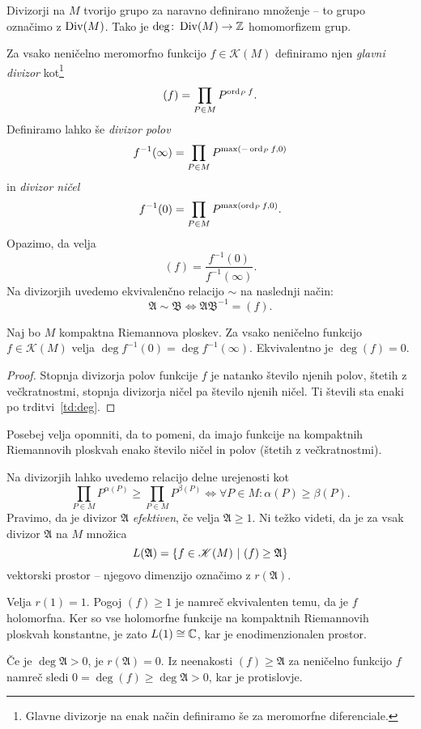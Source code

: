 Divizorji na $M$ tvorijo grupo za naravno definirano množenje --
to grupo označimo z $\operatorname{Div}(M)$. Tako je
$\deg \colon \operatorname{Div}(M) \to \mathbb{Z}$ homomorfizem grup.

Za vsako neničelno meromorfno funkcijo $f \in \mathscr{K}(M)$
definiramo njen \emph{glavni divizor} kot\footnote{Glavne divizorje
na enak način definiramo še za meromorfne diferenciale.}
\[
(f) = \prod_{P \in M} P^{\operatorname{ord}_P f}.
\]
Definiramo lahko še \emph{divizor polov}
\[
f^{-1}(\infty) = \prod_{P \in M} P^{\max(-\operatorname{ord}_P f, 0)}
\]
in \emph{divizor ničel}
\[
f^{-1}(0) = \prod_{P \in M} P^{\max(\operatorname{ord}_P f, 0)}.
\]
Opazimo, da velja
\[
(f) = \frac{f^{-1}(0)}{f^{-1}(\infty)}.
\]
Na divizorjih uvedemo ekvivalenčno relacijo $\sim$ na naslednji način:
\[
\mathfrak{A} \sim \mathfrak{B} \iff
\mathfrak{A} \mathfrak{B}^{-1} = (f).
\]

\begin{lema}
Naj bo $M$ kompaktna Riemannova ploskev. Za vsako neničelno
funkcijo $f \in \mathscr{K}(M)$ velja
$\deg f^{-1}(0) = \deg f^{-1}(\infty)$. Ekvivalentno je
$\deg (f) = 0$.
\end{lema}

\begin{proof}
Stopnja divizorja polov funkcije $f$ je natanko število njenih
polov, štetih z večkratnostmi, stopnja divizorja ničel pa
število njenih ničel. Ti števili sta enaki po
trditvi~\ref{td:deg}.
\end{proof}

Posebej velja opomniti, da to pomeni, da imajo funkcije na
kompaktnih Riemannovih ploskvah enako število ničel in polov
(štetih z večkratnostmi).

Na divizorjih lahko uvedemo relacijo delne urejenosti kot
\[
\prod_{P \in M} P^{\alpha(P)} \geq \prod_{P \in M} P^{\beta(P)}
\iff
\forall P \in M \colon \alpha(P) \geq \beta(P).
\]
Pravimo, da je divizor $\mathfrak{A}$ \emph{efektiven}, če velja
$\mathfrak{A} \geq 1$. Ni težko videti, da je za vsak divizor
$\mathfrak{A}$ na $M$ množica
\[
L(\mathfrak{A}) =
\left\{f \in \mathscr{K}(M)~\middle\vert~(f) \geq \mathfrak{A}\right\}
\]
vektorski prostor -- njegovo dimenzijo označimo z
$r(\mathfrak{A})$.

\begin{zgled}
Velja $r(1) = 1$. Pogoj $(f) \geq 1$ je namreč ekvivalenten temu,
da je $f$ holomorfna. Ker so vse holomorfne funkcije na kompaktnih
Riemannovih ploskvah konstantne, je zato $L(1) \cong \mathbb{C}$, kar je
enodimenzionalen prostor.
\end{zgled}

\begin{zgled}
Če je $\deg \mathfrak{A} > 0$, je $r(\mathfrak{A}) = 0$. Iz
neenakosti $(f) \geq \mathfrak{A}$ za neničelno funkcijo $f$
namreč sledi $0 = \deg (f) \geq \deg \mathfrak{A} > 0$, kar je
protislovje.
\end{zgled}

